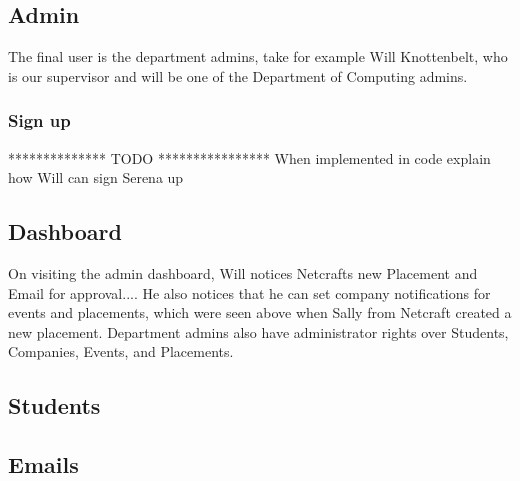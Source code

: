 \subsection{Admin}
  The final user is the department admins, take for example Will Knottenbelt, who is our supervisor and will be one of the Department of Computing admins.
  \subsubsection{Sign up}
    ************** TODO ****************
    When implemented in code explain how Will can sign Serena up

  \subsection{Dashboard}
    On visiting the admin dashboard, Will notices Netcrafts new Placement and Email for approval....
    He also notices that he can set company notifications for events and placements, which were seen above when Sally from Netcraft created a new placement.
    Department admins also have administrator rights over Students, Companies, Events, and Placements.


  \subsection{Students}

  \subsection{Emails}
